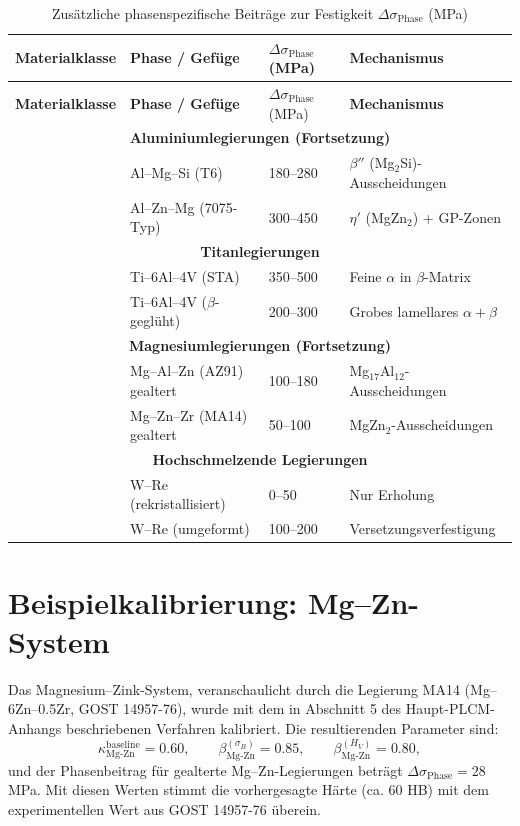 \documentclass[12pt,a4paper]{article}
\begin{document}
	\begin{longtable}{p{3.5cm} p{3.0cm} p{3.0cm} p{4cm}}
		\caption{Zusätzliche phasenspezifische Beiträge zur Festigkeit $\Delta\sigma_{\text{Phase}}$ (MPa)}\label{tab:phase_contrib_extended}\\
		\toprule
		\textbf{Materialklasse} & \textbf{Phase / Gefüge} & $\Delta\sigma_{\text{Phase}}$ (MPa) & \textbf{Mechanismus} \\
		\midrule
		\endfirsthead
		\toprule
		\textbf{Materialklasse} & \textbf{Phase / Gefüge} & $\Delta\sigma_{\text{Phase}}$ (MPa) & \textbf{Mechanismus} \\
		\midrule
		\endhead
		\multicolumn{4}{c}{\textbf{Aluminiumlegierungen (Fortsetzung)}} \\
		& Al–Mg–Si (T6) & 180–280 & $\beta''$ (Mg$_2$Si)-Ausscheidungen \\
		& Al–Zn–Mg (7075-Typ) & 300–450 & $\eta'$ (MgZn$_2$) + GP-Zonen \\
		\hline
		\multicolumn{4}{c}{\textbf{Titanlegierungen}} \\
		& Ti–6Al–4V (STA) & 350–500 & Feine $\alpha$ in $\beta$-Matrix \\
		& Ti–6Al–4V ($\beta$-geglüht) & 200–300 & Grobes lamellares $\alpha+\beta$ \\
		\hline
		\multicolumn{4}{c}{\textbf{Magnesiumlegierungen (Fortsetzung)}} \\
		& Mg–Al–Zn (AZ91) gealtert & 100–180 & Mg$_{17}$Al$_{12}$-Ausscheidungen \\
		& Mg–Zn–Zr (MA14) gealtert & 50–100 & MgZn$_2$-Ausscheidungen \\
		\hline
		\multicolumn{4}{c}{\textbf{Hochschmelzende Legierungen}} \\
		& W–Re (rekristallisiert) & 0–50 & Nur Erholung \\
		& W–Re (umgeformt) & 100–200 & Versetzungsverfestigung \\
		\bottomrule
	\end{longtable}
	
	\section{Beispielkalibrierung: Mg–Zn-System}
	Das Magnesium–Zink-System, veranschaulicht durch die Legierung MA14 (Mg–6Zn–0.5Zr, GOST 14957-76), wurde mit dem in Abschnitt 5 des Haupt-PLCM-Anhangs beschriebenen Verfahren kalibriert. Die resultierenden Parameter sind:
	\[
	\kappa_{\text{Mg-Zn}}^{\text{baseline}} = 0.60,\qquad
	\beta_{\text{Mg-Zn}}^{(\sigma_B)} = 0.85,\qquad
	\beta_{\text{Mg-Zn}}^{(H_V)} = 0.80,
	\]
	und der Phasenbeitrag für gealterte Mg–Zn-Legierungen beträgt $\Delta\sigma_{\text{Phase}} = 28$ MPa. Mit diesen Werten stimmt die vorhergesagte Härte (ca. 60 HB) mit dem experimentellen Wert aus GOST 14957-76 überein.
	
\end{document}
